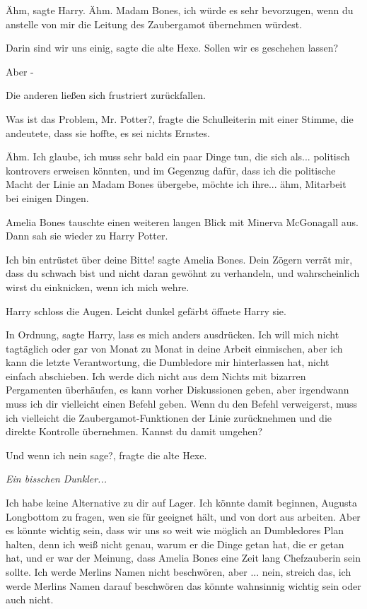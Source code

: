 \glqq{}Ähm\grqq{}, sagte Harry. \glqq{}Ähm. Madam Bones, ich würde es sehr
bevorzugen, wenn du anstelle von mir die Leitung des Zaubergamot übernehmen
würdest.\grqq{}

\glqq{}Darin sind wir uns einig\grqq{}, sagte die alte Hexe. \glqq{}Sollen wir es
geschehen lassen?\grqq{}

\glqq{}Aber -\grqq{}

Die anderen ließen sich frustriert zurückfallen.

\glqq{}Was ist das Problem, Mr. Potter?\grqq{}, fragte die Schulleiterin mit
einer Stimme, die andeutete, dass sie hoffte, es sei nichts Ernstes.

\glqq{}Ähm. Ich glaube, ich muss sehr bald ein paar Dinge tun, die sich als...
politisch kontrovers erweisen könnten, und im Gegenzug dafür, dass ich die
politische Macht der Linie an Madam Bones übergebe, möchte ich ihre... ähm,
Mitarbeit bei einigen Dingen.\grqq{}

Amelia Bones tauschte einen weiteren langen Blick mit Minerva McGonagall aus.
Dann sah sie wieder zu Harry Potter.

\glqq{}Ich bin entrüstet über deine Bitte!\grqq{} sagte Amelia Bones. \glqq{}Dein
Zögern verrät mir, dass du schwach bist und nicht daran gewöhnt zu verhandeln,
und wahrscheinlich wirst du einknicken, wenn ich mich wehre.\grqq{}

Harry schloss die Augen. Leicht dunkel gefärbt öffnete Harry sie.

\glqq{}In Ordnung\grqq{}, sagte Harry, \glqq{}lass es mich anders ausdrücken. Ich
will mich nicht tagtäglich oder gar von Monat zu Monat in deine Arbeit
einmischen, aber ich kann die letzte Verantwortung, die Dumbledore mir
hinterlassen hat, nicht einfach abschieben. Ich werde dich nicht aus dem Nichts
mit bizarren Pergamenten überhäufen, es kann vorher Diskussionen geben, aber
irgendwann muss ich dir vielleicht einen Befehl geben. Wenn du den Befehl
verweigerst, muss ich vielleicht die Zaubergamot-Funktionen der Linie
zurücknehmen und die direkte Kontrolle übernehmen. Kannst du damit umgehen?\grqq{}

\glqq{}Und wenn ich nein sage?\grqq{}, fragte die alte Hexe.

\emph{Ein bisschen Dunkler...}

\glqq{}Ich habe keine Alternative zu dir auf Lager. Ich könnte damit beginnen,
Augusta Longbottom zu fragen, wen sie für geeignet hält, und von dort aus
arbeiten. Aber es könnte wichtig sein, dass wir uns so weit wie möglich an
Dumbledores Plan halten, denn ich weiß nicht genau, warum er die Dinge getan
hat, die er getan hat, und er war der Meinung, dass Amelia Bones eine Zeit lang
Chefzauberin sein sollte. Ich werde Merlins Namen nicht beschwören, aber ...
nein, streich das, ich werde Merlins Namen darauf beschwören das könnte
wahnsinnig wichtig sein oder auch nicht.\grqq{}

